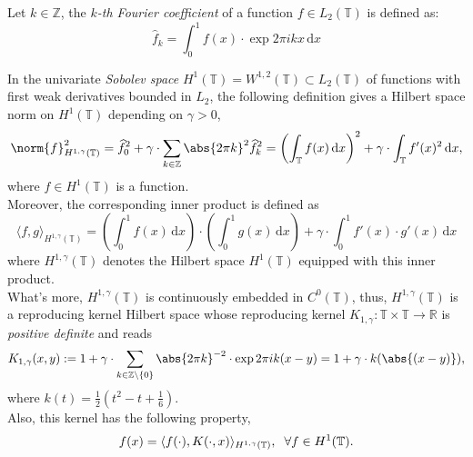 \begin{Def}
    Let $k\in \mathbb{Z}$, the \textit{$k$-th Fourier coefficient} of a function $f\in L_2(\mathbb{T})$ is defined as:
    \begin{equation*}
        \widehat{f}_k = \int_0^1 f(x) \cdot \exp{2\pi ikx} \,\mathrm{d}x
    \end{equation*}
\end{Def}

\vspace{2mm}
In the univariate \textit{Sobolev space} $H^1(\mathbb{T}) = W^{1,2}(\mathbb{T})\subset L_2(\mathbb{T})$ of functions with first weak derivatives bounded in $L_2$, the following definition gives a Hilbert space norm on $H^1(\mathbb{T})$ depending on $\gamma>0$,
\begin{equation*}
    \norm{f}_{H^{1,\gamma}(\mathbb{T})}^2 = \widehat{f}_0^2 + \gamma \cdot \sum_{k\in \mathbb{Z}} \abs{2\pi k}^2 \widehat{f}_k^2 = \left( \int_{\mathbb{T}} f(x) \,\mathrm{d}x \right)^2 + \gamma \cdot \int_{\mathbb{T}} f'(x)^2 \,\mathrm{d}x,
\end{equation*}
where $f \in H^1(\mathbb{T})$ is a function.\\

Moreover, the corresponding inner product is defined as
\begin{equation*}
    \langle f,g \rangle_{H^{1,\gamma}(\mathbb{T})} = \left( \int_0^1 f(x) \,\mathrm{d}x \right) \cdot \left( \int_0^1 g(x) \,\mathrm{d}x \right) + \gamma \cdot \int_0^1 f'(x)\cdot g'(x) \,\mathrm{d}x 
\end{equation*}
where $H^{1,\gamma}(\mathbb{T})$ denotes the Hilbert space $H^1(\mathbb{T})$ equipped with this inner product.\\

What's more, $H^{1,\gamma}(\mathbb{T})$ is continuously embedded in $C^0(\mathbb{T})$, thus, $H^{1,\gamma}(\mathbb{T})$ is a reproducing kernel Hilbert space whose reproducing kernel $K_{1,\gamma} : \mathbb{T}\times\mathbb{T} \longrightarrow \mathbb{R}$ is \textit{positive definite} and reads
\begin{equation*}
    K_{1,\gamma}(x,y) := 1 + \gamma \cdot \sum_{k\in \mathbb{Z}\setminus\{0\}} \abs{2\pi k}^{-2} \cdot \exp{2\pi ik(x-y)} = 1 + \gamma \cdot k(\abs{(x-y)}), 
\end{equation*}
where $k(t) = \frac{1}{2} (t^2 - t + \frac{1}{6})$.\\

Also, this kernel has the following property,
\begin{equation*}
    f(x) = \langle f(\cdot),K(\cdot,x) \rangle_{H^{1,\gamma}(\mathbb{T})}, \hspace{2mm} \forall f\in H^1(\mathbb{T}).
\end{equation*}

